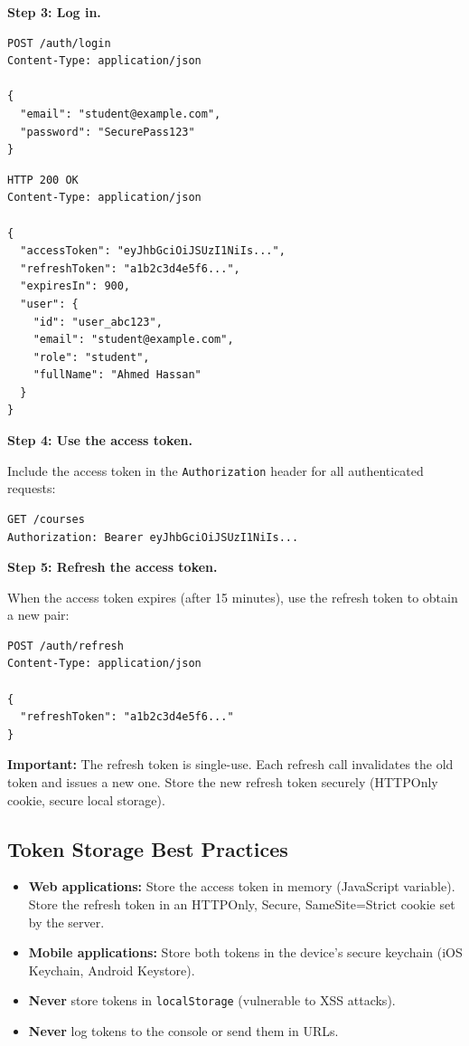 \textbf{Step 3: Log in.}

\begin{lstlisting}[caption=Login and obtain tokens,label=lst:guide-login]
POST /auth/login
Content-Type: application/json

{
  "email": "student@example.com",
  "password": "SecurePass123"
}
\end{lstlisting}

\begin{lstlisting}[caption=Response with tokens,label=lst:guide-tokens]
HTTP 200 OK
Content-Type: application/json

{
  "accessToken": "eyJhbGciOiJSUzI1NiIs...",
  "refreshToken": "a1b2c3d4e5f6...",
  "expiresIn": 900,
  "user": {
    "id": "user_abc123",
    "email": "student@example.com",
    "role": "student",
    "fullName": "Ahmed Hassan"
  }
}
\end{lstlisting}

\textbf{Step 4: Use the access token.}

Include the access token in the \texttt{Authorization} header for all authenticated requests:

\begin{lstlisting}[caption=Authenticated request,label=lst:guide-auth-request]
GET /courses
Authorization: Bearer eyJhbGciOiJSUzI1NiIs...
\end{lstlisting}

\textbf{Step 5: Refresh the access token.}

When the access token expires (after 15 minutes), use the refresh token to obtain a new pair:

\begin{lstlisting}[caption=Refresh tokens,label=lst:guide-refresh]
POST /auth/refresh
Content-Type: application/json

{
  "refreshToken": "a1b2c3d4e5f6..."
}
\end{lstlisting}

\textbf{Important:} The refresh token is single-use. Each refresh call invalidates the old token and issues a new one. Store the new refresh token securely (HTTPOnly cookie, secure local storage).

\subsection{Token Storage Best Practices}

\begin{itemize}
  \item \textbf{Web applications:} Store the access token in memory (JavaScript variable). Store the refresh token in an HTTPOnly, Secure, SameSite=Strict cookie set by the server.
  \item \textbf{Mobile applications:} Store both tokens in the device's secure keychain (iOS Keychain, Android Keystore).
  \item \textbf{Never} store tokens in \texttt{localStorage} (vulnerable to XSS attacks).
  \item \textbf{Never} log tokens to the console or send them in URLs.
\end{itemize}

